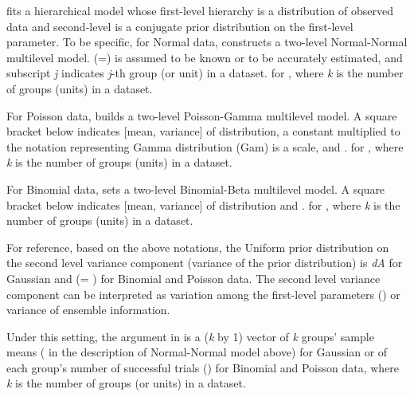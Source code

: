 \documentclass[a4paper]{book}
\begin{document}
\begin{Details}\relax
{} fits a hierarchical model whose first-level hierarchy is a distribution of observed data and second-level is a conjugate prior distribution on the first-level parameter. To be specific, for Normal data,  constructs a two-level Normal-Normal multilevel model.  (=) is assumed to be known or to be accurately estimated, and subscript \emph{j} indicates \emph{j}-th group 
(or unit) in a dataset.
for , where \emph{k} is the number of groups (units) in a dataset.

For Poisson data,  builds a two-level Poisson-Gamma multilevel model. A square bracket below indicates [mean, variance] of distribution, a constant multiplied to the notation representing Gamma distribution (Gam) is a scale, and .
for , where \emph{k} is the number of groups (units) in a dataset.

For Binomial data,  sets a two-level Binomial-Beta multilevel model. A square bracket below indicates [mean, variance] of distribution and .
for , where \emph{k} is the number of groups (units) in a dataset.

For reference, based on the above notations, the Uniform prior distribution on the second level variance component (variance of the prior distribution) is \emph{dA} for Gaussian and  
(= ) for Binomial and Poisson data. The second level variance component can be interpreted as variation among the first-level parameters () or variance of ensemble information.

Under this setting, the argument  in  is a (\emph{k} by 1) vector of \emph{k} groups' sample means ( in the description of Normal-Normal model above) for Gaussian or of each group's number of successful trials () for Binomial and Poisson data, where \emph{k} is the number of groups (or units) in a dataset.


\end{Details}
\end{document}
